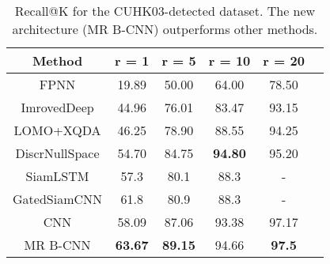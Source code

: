 \begin{table}%
\begin{center}
\caption{Recall@K for the CUHK03-detected dataset. The new architecture (MR B-CNN) outperforms other methods.}
\begin{tabular}{c|ccccc}
\hline
Method                & r = 1   &  r = 5   & r = 10   & r = 20 \\
\hline
 FPNN \citep{Li14}  & 19.89  & 50.00 & 64.00         & 78.50   \\
 ImrovedDeep \citep{ahmed2015improved}& 44.96 & 76.01  & 83.47        & 93.15   \\
 LOMO+XQDA \citep{liao2015person}   & 46.25 & 78.90  & 88.55       & 94.25   \\
 DiscrNullSpace \citep{zhang2016learning}& 54.70 & 84.75   & \bf{94.80}         & 95.20 \\
 SiamLSTM \citep{VariorSLXW16}    & 57.3   &80.1    & 88.3        &-        \\
 GatedSiamCNN \citep{VariorHW16}     & 61.8    &  80.9    & 88.3         & -      \\
 \hline
 CNN                   &58.09   & 87.06    & 93.38     & 97.17  \\
 MR B-CNN        &\bf{63.67}   &\bf{89.15}    & 94.66     & \bf{97.5}   \\
 \hline
\end{tabular}
\label{tab:cuhk03_detected}
\end{center}
\end{table} 




